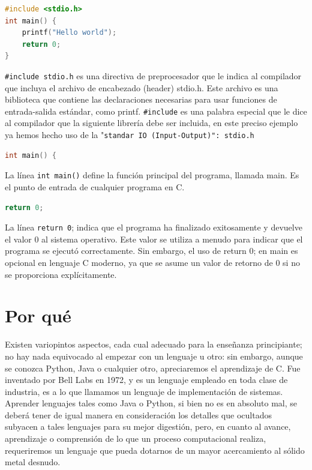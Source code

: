 \documentclass{article}
\begin{document}
\begin{lstlisting}[style=mystyle, language=C]
#include <stdio.h>
int main() {
    printf("Hello world");
    return 0;
}
\end{lstlisting}
\texttt{\#include \<stdio.h\>} es una directiva de preprocesador que le indica al compilador que incluya el archivo de encabezado (header) stdio.h. Este archivo es una biblioteca que contiene las declaraciones necesarias para usar funciones de entrada-salida estándar, como printf. \texttt{\#include} es una palabra especial que le dice al compilador que la siguiente librería debe ser incluida, en este preciso ejemplo ya hemos hecho uso de la "\texttt{standar IO (Input-Output)": \<stdio.h\>} \\

\begin{lstlisting}[style=mystyle, language=C]
int main() {
\end{lstlisting}
La línea \texttt{int main()} define la función principal del programa, llamada main. Es el punto de entrada de cualquier programa en C.\\

\begin{lstlisting}[style=mystyle, language=C]
return 0; 
\end{lstlisting}
La línea \texttt{return 0}; indica que el programa ha finalizado exitosamente y devuelve el valor 0 al sistema operativo. Este valor se utiliza a menudo para indicar que el programa se ejecutó correctamente. Sin embargo, el uso de return 0; en main es opcional en lenguaje C moderno, ya que se asume un valor de retorno de 0 si no se proporciona explícitamente.

\section{Por qué}
Existen variopintos aspectos, cada cual adecuado para la enseñanza principiante; no hay nada equivocado al empezar con un lenguaje u otro: sin embargo, aunque se conozca Python, Java o cualquier otro, apreciaremos el aprendizaje de C. Fue inventado por Bell Labs en 1972, y es un lenguaje empleado en toda clase de industria, es a lo que llamamos un lenguaje de implementación de sistemas. Aprender lenguajes tales como Java o Python, si bien no es en absoluto mal, se deberá tener de igual manera en consideración los detalles que ocultados subyacen a tales lenguajes para su mejor digestión, pero, en cuanto al avance, aprendizaje o comprensión de lo que un proceso computacional realiza, requeriremos un lenguaje que pueda dotarnos de un mayor acercamiento al sólido metal desnudo.
\end{document}
